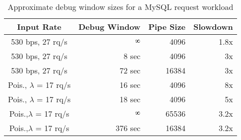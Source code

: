 \begin{table}[ht]
	\centering
\setlength{\tabcolsep}{2pt}
	\begin{tabular}{c r r r }
		\toprule
		{\bf Input Rate} & \textbf{Debug Window} & \textbf{Pipe Size} & \textbf{Slowdown} \\ \midrule
		530 bps, 27 rq/s                                            & $\infinity$                                                                                     & 4096                                                                            & 1.8x                                                                             \\ %
		530 bps, 27 rq/s                                            & 8 sec                                                                              & 4096                                                                            & 3x                                                                               \\ %
		530 bps, 27 rq/s                                            & 72 sec                                                                             & 16384                                                                           & 3x                                                                               \\ %
		Pois., $\lambda$ = 17 rq/s                                        & 16 sec                                                                             & 4096                                                                            & 8x                                                                               \\ %
Pois.,		$\lambda$ = 17 rq/s                                        & 18 sec                                                                             & 4096                                                                            & 5x                                                                               \\ %
		Pois.,$\lambda$ = 17 rq/s                                        & $\infinity$                                                                                     & 65536                                                                           & 3.2x                                                                             \\ %
		Pois.,$\lambda$ = 17 rq/s                                        & 376 sec                                                                            & 16384                                                                           & 3.2x                                                                             \\ %
		\bottomrule
	\end{tabular}
	\caption{Approximate debug window sizes for a MySQL request workload}
	\label{table:timewindow}
\end{table}

